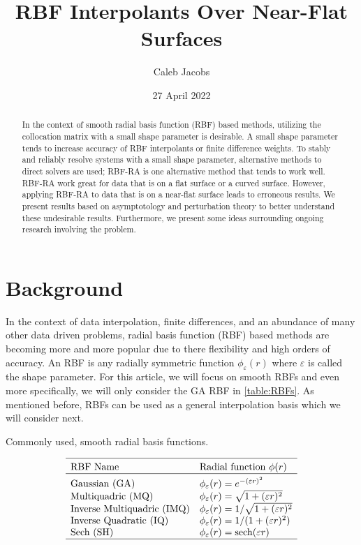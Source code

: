\documentclass[a4paper,11pt]{article}
\title{RBF Interpolants Over Near-Flat Surfaces}
\author{Caleb Jacobs}
\date{27 April 2022}
\DeclareMathOperator{\sech}{sech}
\newcommand{\eps}{\varepsilon}
\begin{document}
\maketitle
\thispagestyle{empty}

\begin{abstract}
	\noindent
	In the context of smooth radial basis function (RBF) based methods, utilizing the collocation matrix with a small shape parameter is desirable. A small shape parameter tends to increase accuracy of RBF interpolants or finite difference weights. To stably and reliably resolve systems with a small shape parameter, alternative methods to direct solvers are used; RBF-RA is one alternative method that tends to work well.  RBF-RA work great for data that is on a flat surface or a curved surface. However, applying RBF-RA to data that is on a near-flat surface leads to erroneous results. We present results based on asymptotology and perturbation theory to better understand these undesirable results. Furthermore, we present some ideas surrounding ongoing research involving the problem.
\end{abstract}

\section{Background}
In the context of data interpolation, finite differences, and an abundance of many other data driven problems, radial basis function (RBF) based methods are becoming more and more popular due to there flexibility and high orders of accuracy. An RBF is any radially symmetric function $ \phi_\eps(r) $ where $ \eps $ is called the shape parameter. For this article, we will focus on smooth RBFs and even more specifically, we will only consider the GA RBF in \autoref{table:RBFs}. As mentioned before, RBFs can be used as a general interpolation basis which we will consider next.

\begin{table}[t]
	\captionsetup{width = 0.57\linewidth}
	\caption{Commonly used, smooth radial basis functions.}
	\[
	\begin{array}{ll}
		\hline \\[-2ex]
		\text{RBF Name} & \text{Radial function } \phi(r) \\
		\hline \\[-2ex]
		\text{Gaussian (GA)} & \phi_\eps(r) = e^{-(\eps r)^2} \\
		\text{Multiquadric (MQ)} & \phi_\eps(r) = \sqrt{1 + (\eps r)^2} \\
		\text{Inverse Multiquadric (IMQ)} & \phi_\eps(r) = 1 / \sqrt{1 + (\eps r)^2} \\
		\text{Inverse Quadratic (IQ)} & \phi_\eps(r) = 1 / (1 + (\eps r)^2) \\
		\text{Sech (SH)} & \phi_\eps(r) = \sech(\eps r) \\
		\hline
	\end{array}
	\]
	\label{table:RBFs}
\end{table}
\end{document}
